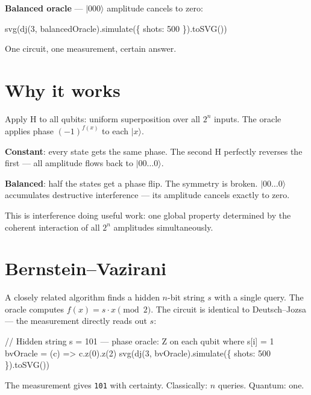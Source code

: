 \documentclass[
  11pt,
  letterpaper,
  oneside]{scrbook}
\newenvironment{Shaded}{\begin{snugshade}}{\end{snugshade}}
\newcommand{\NormalTok}[1]{\textcolor[rgb]{0.00,0.23,0.31}{#1}}
\begin{document}
\textbf{Balanced oracle} --- \(|000\rangle\) amplitude cancels to zero:

\begin{Shaded}
\begin{Highlighting}[]
\NormalTok{svg(dj(3, balancedOracle).simulate(\{ shots: 500 \}).toSVG())}
\end{Highlighting}
\end{Shaded}

One circuit, one measurement, certain answer.

\section{Why it works}\label{why-it-works}

Apply H to all qubits: uniform superposition over all \(2^n\) inputs.
The oracle applies phase \((-1)^{f(x)}\) to each \(|x\rangle\).

\textbf{Constant}: every state gets the same phase. The second H
perfectly reverses the first --- all amplitude flows back to
\(|00\ldots0\rangle\).

\textbf{Balanced}: half the states get a phase flip. The symmetry is
broken. \(|00\ldots0\rangle\) accumulates destructive interference ---
its amplitude cancels exactly to zero.

This is interference doing useful work: one global property determined
by the coherent interaction of all \(2^n\) amplitudes simultaneously.

\section{Bernstein--Vazirani}\label{bernsteinvazirani}

A closely related algorithm finds a hidden \(n\)-bit string \(s\) with a
single query. The oracle computes \(f(x) = s \cdot x \pmod{2}\). The
circuit is identical to Deutsch--Jozsa --- the measurement directly
reads out \(s\):

\begin{Shaded}
\begin{Highlighting}[]
\NormalTok{// Hidden string s = 101 — phase oracle: Z on each qubit where s[i] = 1}
\NormalTok{bvOracle = (c) =\textgreater{} c.z(0).z(2)}
\NormalTok{svg(dj(3, bvOracle).simulate(\{ shots: 500 \}).toSVG())}
\end{Highlighting}
\end{Shaded}

The measurement gives \texttt{101} with certainty. Classically: \(n\)
queries. Quantum: one.
\end{document}
